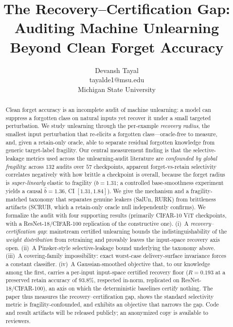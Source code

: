 \documentclass{article}
\title{The Recovery--Certification Gap:\\ Auditing Machine Unlearning Beyond Clean Forget Accuracy}
\author{\name Devansh Tayal \\ \email tayalde1@msu.edu \\ \addr Michigan State University}
\begin{document}
\maketitle

\begin{abstract}
Clean forget accuracy is an incomplete audit of machine unlearning: a model can suppress a forgotten class on natural inputs yet recover it under a small targeted perturbation. We study unlearning through the per-example \emph{recovery radius}, the smallest input perturbation that re-elicits a forgotten class---oracle-free to measure, and, given a retain-only oracle, able to separate residual forgotten knowledge from generic target-label fragility. Our central measurement finding is that the selective-leakage metrics used across the unlearning-audit literature are \emph{confounded by global fragility}: across $132$ audits over $57$ checkpoints, apparent forget-vs-retain selectivity correlates negatively with how brittle a checkpoint is overall, because the forget radius is \emph{super-linearly} elastic to fragility ($b{=}1.31$; a controlled base-smoothness experiment yields a causal $\hat b{=}1.36$, CI $[1.31,1.84]$). We give the mechanism and a fragility-matched taxonomy that separates genuine leakers (SalUn, RURK) from brittleness artifacts (SCRUB, which a retain-only oracle null independently confirms). We formalize the audit with four supporting results (primarily CIFAR-10 ViT checkpoints, with a ResNet-18/CIFAR-100 replication of the constructive one). (i)~A \emph{recovery--certification gap}: mainstream certified unlearning bounds the indistinguishability of the \emph{weight distribution} from retraining and provably leaves the input-space recovery axis open. (ii)~A Pinsker-style selective-leakage bound underlying the taxonomy above. (iii)~A covering-family impossibility: exact worst-case delivery-surface invariance forces a constant classifier. (iv)~A Gaussian-smoothed objective that, to our knowledge among the first, carries a per-input input-space certified recovery floor ($R{=}0.193$ at a preserved retain accuracy of $93.8\%$, respected in-norm, replicated on ResNet-18/CIFAR-100), an axis on which the deterministic baselines certify nothing. The paper thus measures the recovery--certification gap, shows the standard selectivity metric is fragility-confounded, and exhibits an objective that narrows the gap. Code and result artifacts will be released publicly; an anonymized copy is available to reviewers.
\end{abstract}
\end{document}
